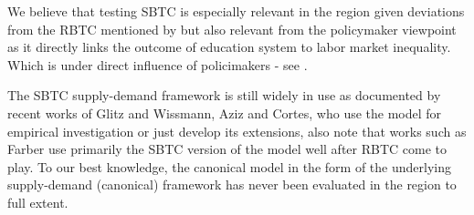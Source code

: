 \documentclass[11pt]{article}
\begin{document}
We believe that testing SBTC is especially relevant in the region given deviations from the RBTC mentioned by \citep{arendt2019technical, hardy2018educational} but also relevant from the policymaker viewpoint as it directly links the outcome of education system to labor market inequality. Which is under direct influence of policimakers - see \citep{goldin2010race}. 

The SBTC supply-demand framework is still widely in use as documented by recent works of Glitz and Wissmann, Aziz and Cortes, who use the model for empirical investigation or just develop its extensions, also note that works such as Farber use primarily the SBTC version of the model well after RBTC come to play. To our best knowledge, the canonical model in the form of the underlying supply-demand (canonical) framework has never been evaluated in the region to full extent.





\end{document}
